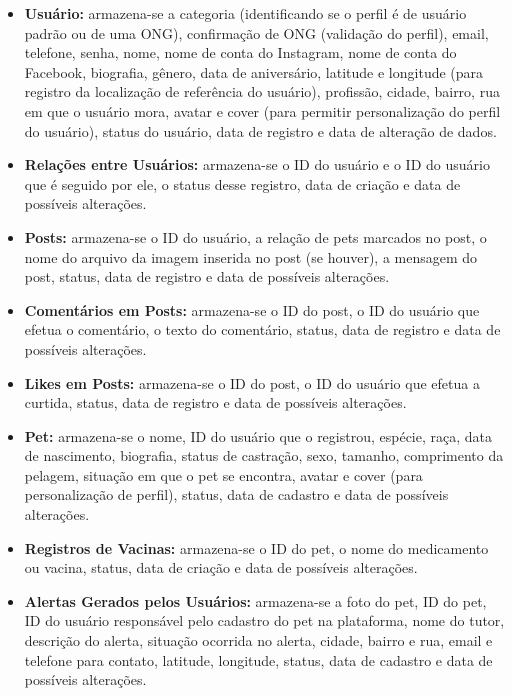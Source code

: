\begin{itemize}
\item \textbf{Usuário:} armazena-se a categoria (identificando se o perfil é de usuário padrão ou de uma ONG), confirmação de ONG (validação do perfil), email, telefone, senha, nome, nome de conta do Instagram, nome de conta do Facebook, biografia, gênero, data de aniversário, latitude e longitude (para registro da localização de referência do usuário), profissão, cidade, bairro, rua em que o usuário mora, avatar e cover (para permitir personalização do perfil do usuário), status do usuário, data de registro e data de alteração de dados.

\item \textbf{Relações entre Usuários:} armazena-se o ID do usuário e o ID do usuário que é seguido por ele, o status desse registro, data de criação e data de possíveis alterações.

\item \textbf{Posts:} armazena-se o ID do usuário, a relação de pets marcados no post, o nome do arquivo da imagem inserida no post (se houver), a mensagem do post, status, data de registro e data de possíveis alterações.

\item \textbf{Comentários em Posts:} armazena-se o ID do post, o ID do usuário que efetua o comentário, o texto do comentário, status, data de registro e data de possíveis alterações.

\item \textbf{Likes em Posts:} armazena-se o ID do post, o ID do usuário que efetua a curtida, status, data de registro e data de possíveis alterações.

\item \textbf{Pet:} armazena-se o nome, ID do usuário que o registrou, espécie, raça, data de nascimento, biografia, status de castração, sexo, tamanho, comprimento da pelagem, situação em que o pet se encontra, avatar e cover (para personalização de perfil), status, data de cadastro e data de possíveis alterações.

\item \textbf{Registros de Vacinas:} armazena-se o ID do pet, o nome do medicamento ou vacina, status, data de criação e data de possíveis alterações.

\item \textbf{Alertas Gerados pelos Usuários:} armazena-se a foto do pet, ID do pet, ID do usuário responsável pelo cadastro do pet na plataforma, nome do tutor, descrição do alerta, situação ocorrida no alerta, cidade, bairro e rua, email e telefone para contato, latitude, longitude, status, data de cadastro e data de possíveis alterações.


\end{itemize}
